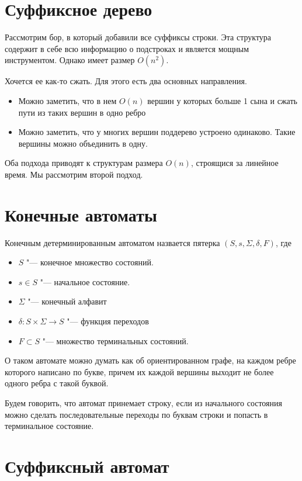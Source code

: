 \documentclass[12pt,a4paper]{article}
\theoremstyle{plain}
\begin{document}
\section{Суффиксное дерево}

Рассмотрим бор, в который добавили все суффиксы строки.
Эта структура содержит в себе всю информацию о подстроках и является мощным
инструментом. Однако имеет размер $O(n^2)$.

Хочется ее как-то сжать. Для этого есть два основных направления.
\begin{itemize}
\item Можно заметить, что в нем $O(n)$ вершин у которых больше 1 сына и сжать пути из таких вершин в одно ребро
\item Можно заметить, что у многих вершин поддерево устроено одинаково. Такие вершины можно объединить в одну.
\end{itemize}

Оба подхода приводят к структурам размера $O(n)$, строящися за линейное время. Мы рассмотрим второй подход.

\section{Конечные автоматы}

Конечным детерминированным автоматом назвается пятерка $(S, s, \Sigma, \delta, F)$, где 
\begin{itemize}
\item $S$ "--- конечное множество состояний.
\item $s \in S$ "--- начальное состояние.
\item $\Sigma$ "--- конечный алфавит
\item $\delta: S \times \Sigma \rightarrow S$ "--- функция переходов
\item $F \subset S$ "--- множество терминальных состояний.
\end{itemize}

О таком автомате можно думать как об ориентированном графе, на каждом ребре
которого написано по букве, причем их каждой вершины выходит не более одного ребра с такой буквой.

Будем говорить, что автомат принемает строку, если из начального состояния можно сделать последовательные переходы 
по буквам строки и попасть в терминальное состояние.

\section{Суффиксный автомат}
\end{document}
